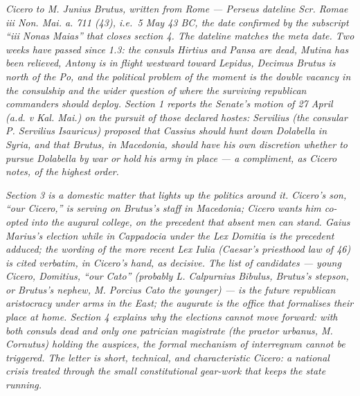 
\textit{Cicero to M. Junius Brutus, written from Rome ---
Perseus dateline \textit{Scr. Romae iii Non. Mai. a. 711
(43)}, i.e.\ 5 May 43 BC, the date confirmed by the
subscript ``\textit{iii Nonas Maias}'' that closes
section 4. The dateline matches the meta date. Two weeks
have passed since 1.3: the consuls Hirtius and Pansa are
dead, Mutina has been relieved, Antony is in flight
westward toward Lepidus, Decimus Brutus is north of the
Po, and the political problem of the moment is the
double vacancy in the consulship and the wider question
of where the surviving republican commanders should
deploy. Section 1 reports the Senate's motion of 27 April
(a.d. v Kal. Mai.) on the pursuit of those declared
hostes: Servilius (the consular P. Servilius Isauricus)
proposed that Cassius should hunt down Dolabella in
Syria, and that Brutus, in Macedonia, should have his
own discretion whether to pursue Dolabella by war or hold
his army in place --- a compliment, as Cicero notes, of
the highest order.}

\textit{Section 3 is a domestic matter that lights up
the politics around it. Cicero's son, ``our Cicero,'' is
serving on Brutus's staff in Macedonia; Cicero wants him
co-opted into the augural college, on the precedent that
absent men can stand. Gaius Marius's election while in
Cappadocia under the Lex Domitia is the precedent
adduced; the wording of the more recent Lex Iulia (Caesar's
priesthood law of 46) is cited verbatim, in Cicero's hand,
as decisive. The list of candidates --- young Cicero,
Domitius, ``our Cato'' (probably L. Calpurnius Bibulus,
Brutus's stepson, or Brutus's nephew, M. Porcius Cato the
younger) --- is the future republican aristocracy under
arms in the East; the augurate is the office that
formalises their place at home. Section 4 explains why
the elections cannot move forward: with both consuls dead
and only one patrician magistrate (the praetor urbanus,
M. Cornutus) holding the auspices, the formal mechanism
of \textit{interregnum} cannot be triggered. The letter is
short, technical, and characteristic Cicero: a national
crisis treated through the small constitutional gear-work
that keeps the state running.}
